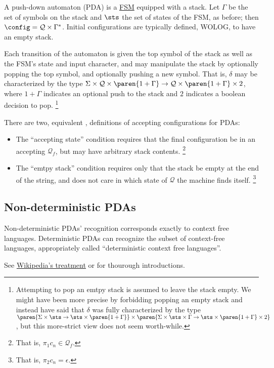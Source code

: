 A push-down automaton (PDA) is a \hyperref[sec:zoo-str/fsm]{FSM} equipped
with a stack.  Let $\Gamma$ be the set of symbols on the stack and $\sts$
the set of states of the FSM, as before; then $\config = \mathcal{Q} \times
\Gamma^*$.  Initial configurations are typically defined, WOLOG, to have an
empty stack.

Each transition of the automaton is given the top symbol of the
stack as well as the FSM's state and input character, and may manipulate the
stack by optionally popping the top symbol, and optionally pushing a new
symbol.  That is, $\delta$ may be characterized by the type $\Sigma
\times \mathcal{Q} \times \paren{1 + \Gamma} \to \mathcal{Q} \times
\paren{1 + \Gamma} \times 2$, where $1 + \Gamma$ indicates an optional push
to the stack and $2$ indicates a boolean decision to pop.%
%
\footnote{Attempting to pop an emtpy stack is assumed to leave the stack
empty.  We might have been more precise by forbidding popping an empty stack
and instead have said that $\delta$ was fully characterized by the type
$\paren{\Sigma \times \sts \to \sts \times \paren{1 + \Gamma}} \times
\paren{\Sigma \times \sts \times \Gamma \to \sts \times \paren{1 + \Gamma}
\times 2}$, but this more-strict view does not seem worth-while.}
%

There are two, equivalent \cite{xxx}, definitions of accepting
configurations for PDAs:
%
\begin{itemize}
%
    \item The ``accepting state'' condition requires that the final
    configuration be in an accepting $\mathcal{Q}_f$, but may have arbitrary stack
    contents.%
    \footnote{That is, $\pi_1 c_n \in \mathcal{Q}_f$.}
%
    \item The ``emtpy stack'' condition requires only that the stack be
    empty at the end of the string, and does not care in which state of
    $\mathcal{Q}$ the machine finds itself.
    \footnote{That is, $\pi_2 c_n = \epsilon$.}
%
\end{itemize}


\subsection{Non-deterministic PDAs}

Non-deterministic PDAs' recognition corresponds exactly to context free languages.
Deterministic PDAs can recognize the subset of context-free languages,
appropriately called ``deterministic context free languages''.

See \href{http://wikipedia.org/Push-down\_automaton}{Wikipedia's treatment}
or \cite[Ch. 2]{sipser:theorycomp} for thourough introductions.


